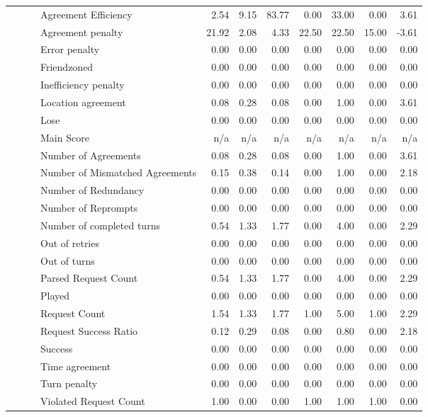 \begin{tabular}{llllrrrrrrr}
 &  &  & Agreement Efficiency & 2.54 & 9.15 & 83.77 & 0.00 & 33.00 & 0.00 & 3.61 \\
 &  &  & Agreement penalty & 21.92 & 2.08 & 4.33 & 22.50 & 22.50 & 15.00 & -3.61 \\
 &  &  & Error penalty & 0.00 & 0.00 & 0.00 & 0.00 & 0.00 & 0.00 & 0.00 \\
 &  &  & Friendzoned & 0.00 & 0.00 & 0.00 & 0.00 & 0.00 & 0.00 & 0.00 \\
 &  &  & Inefficiency penalty & 0.00 & 0.00 & 0.00 & 0.00 & 0.00 & 0.00 & 0.00 \\
 &  &  & Location agreement & 0.08 & 0.28 & 0.08 & 0.00 & 1.00 & 0.00 & 3.61 \\
 &  &  & Lose & 0.00 & 0.00 & 0.00 & 0.00 & 0.00 & 0.00 & 0.00 \\
 &  &  & Main Score & n/a & n/a & n/a & n/a & n/a & n/a & n/a \\
 &  &  & Number of Agreements & 0.08 & 0.28 & 0.08 & 0.00 & 1.00 & 0.00 & 3.61 \\
 &  &  & Number of Mismatched Agreements & 0.15 & 0.38 & 0.14 & 0.00 & 1.00 & 0.00 & 2.18 \\
 &  &  & Number of Redundancy & 0.00 & 0.00 & 0.00 & 0.00 & 0.00 & 0.00 & 0.00 \\
 &  &  & Number of Reprompts & 0.00 & 0.00 & 0.00 & 0.00 & 0.00 & 0.00 & 0.00 \\
 &  &  & Number of completed turns & 0.54 & 1.33 & 1.77 & 0.00 & 4.00 & 0.00 & 2.29 \\
 &  &  & Out of retries & 0.00 & 0.00 & 0.00 & 0.00 & 0.00 & 0.00 & 0.00 \\
 &  &  & Out of turns & 0.00 & 0.00 & 0.00 & 0.00 & 0.00 & 0.00 & 0.00 \\
 &  &  & Parsed Request Count & 0.54 & 1.33 & 1.77 & 0.00 & 4.00 & 0.00 & 2.29 \\
 &  &  & Played & 0.00 & 0.00 & 0.00 & 0.00 & 0.00 & 0.00 & 0.00 \\
 &  &  & Request Count & 1.54 & 1.33 & 1.77 & 1.00 & 5.00 & 1.00 & 2.29 \\
 &  &  & Request Success Ratio & 0.12 & 0.29 & 0.08 & 0.00 & 0.80 & 0.00 & 2.18 \\
 &  &  & Success & 0.00 & 0.00 & 0.00 & 0.00 & 0.00 & 0.00 & 0.00 \\
 &  &  & Time agreement & 0.00 & 0.00 & 0.00 & 0.00 & 0.00 & 0.00 & 0.00 \\
 &  &  & Turn penalty & 0.00 & 0.00 & 0.00 & 0.00 & 0.00 & 0.00 & 0.00 \\
 &  &  & Violated Request Count & 1.00 & 0.00 & 0.00 & 1.00 & 1.00 & 1.00 & 0.00 \\

\end{tabular}
